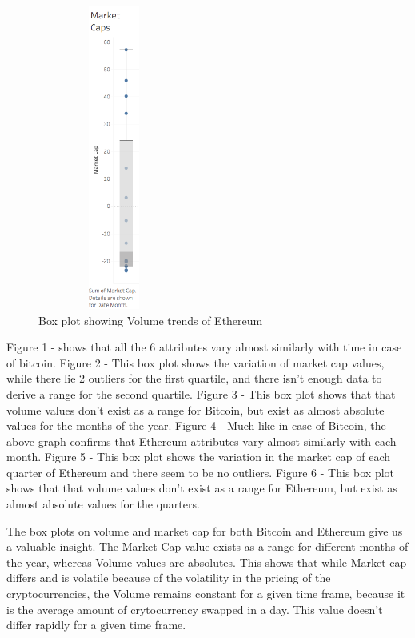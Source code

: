 \documentclass{article}
\begin{document}
\vfill
\begin{figure}

    \centering
    \includegraphics[width = 5cm,height=10cm]{Sheet23.png}
    \caption{Box plot showing Volume trends of Ethereum}
    \label{fig:my_label}
    
\end{figure}
\newpage
Figure 1 - shows that all the 6 attributes vary almost similarly with time in case of bitcoin.\newline
Figure 2 - This box plot shows the variation of market cap values, while there lie 2 outliers for the first quartile, and there isn't enough data to derive a range for the second quartile. \newline
Figure 3 - This box plot shows that that volume values don't exist as a range for Bitcoin, but exist as almost absolute values for the months of the year.\newline
Figure 4 - Much like in case of Bitcoin, the above graph confirms that Ethereum attributes vary almost similarly with each month.\newline
Figure 5 - This box plot shows the variation in the market cap of each quarter of Ethereum and there seem to be no outliers.\newline
Figure 6 - This box plot shows that that volume values don't exist as a range for Ethereum, but exist as almost absolute values for the quarters.\newline

The box plots on volume and market cap for both Bitcoin and Ethereum give us a valuable insight. The Market Cap value exists as a range for different months of the year, whereas Volume values are absolutes. This shows that while Market cap differs and is volatile because of the volatility in the pricing of the cryptocurrencies, the Volume remains constant for a given time frame, because it is the average amount of crytocurrency swapped in a day. This value doesn't differ rapidly for a given time frame.
\end{document}
